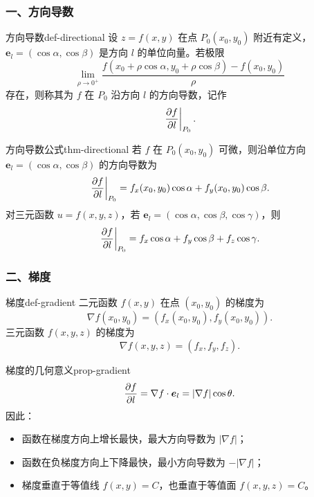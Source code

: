 \subsubsection*{一、方向导数}

\begin{dy}{方向导数}{def-directional}
设 $z=f(x,y)$ 在点 $P_0(x_0,y_0)$ 附近有定义，$\bm e_l=(\cos\alpha,\cos\beta)$ 是方向 $l$ 的单位向量。若极限
\[
  \lim_{\rho\to0^+}
  \frac{f(x_0+\rho\cos\alpha,y_0+\rho\cos\beta)-f(x_0,y_0)}{\rho}
\]
存在，则称其为 $f$ 在 $P_0$ 沿方向 $l$ 的方向导数，记作
\[
  \left.\frac{\partial f}{\partial l}\right|_{P_0}.
\]
\end{dy}

\begin{dl}{方向导数公式}{thm-directional}
若 $f$ 在 $P_0(x_0,y_0)$ 可微，则沿单位方向 $\bm e_l=(\cos\alpha,\cos\beta)$ 的方向导数为
\[
  \left.\frac{\partial f}{\partial l}\right|_{P_0}
  =f_x(x_0,y_0)\cos\alpha+f_y(x_0,y_0)\cos\beta.
\]
对三元函数 $u=f(x,y,z)$，若 $\bm e_l=(\cos\alpha,\cos\beta,\cos\gamma)$，则
\[
  \left.\frac{\partial f}{\partial l}\right|_{P_0}
  =f_x\cos\alpha+f_y\cos\beta+f_z\cos\gamma.
\]
\end{dl}

\subsubsection*{二、梯度}

\begin{dy}{梯度}{def-gradient}
二元函数 $f(x,y)$ 在点 $(x_0,y_0)$ 的梯度为
\[
  \nabla f(x_0,y_0)=\left(f_x(x_0,y_0),f_y(x_0,y_0)\right).
\]
三元函数 $f(x,y,z)$ 的梯度为
\[
  \nabla f(x,y,z)=\left(f_x,f_y,f_z\right).
\]
\end{dy}

\begin{xz}{梯度的几何意义}{prop-gradient}
\[
  \frac{\partial f}{\partial l}=\nabla f\cdot \bm e_l=|\nabla f|\cos\theta.
\]
因此：
\begin{itemize}
  \item 函数在梯度方向上增长最快，最大方向导数为 $|\nabla f|$；
  \item 函数在负梯度方向上下降最快，最小方向导数为 $-|\nabla f|$；
  \item 梯度垂直于等值线 $f(x,y)=C$，也垂直于等值面 $f(x,y,z)=C$。
\end{itemize}
\end{xz}


